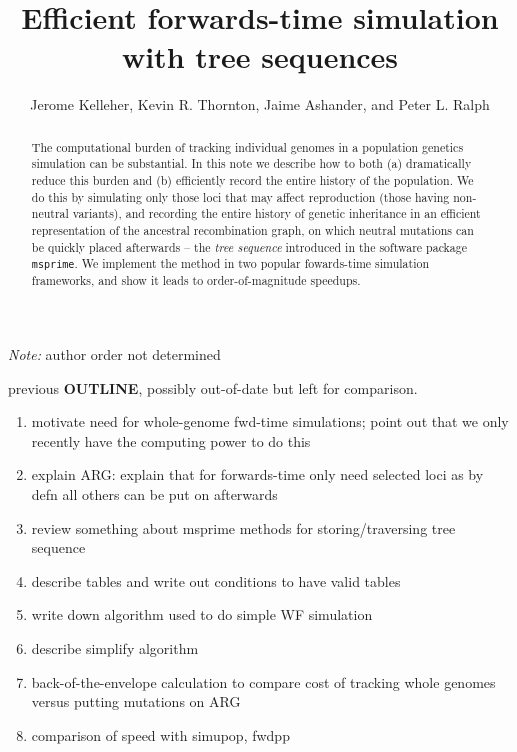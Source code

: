 \documentclass{article}
\newcommand{\msprime}{\texttt{msprime}}
\begin{document}
\title{Efficient forwards-time simulation with tree sequences}
\author{Jerome Kelleher,
        Kevin R. Thornton,
        Jaime Ashander, and
        Peter L. Ralph}
\maketitle

\emph{Note:} author order not determined


\begin{abstract}
    The computational burden of tracking individual genomes 
    in a population genetics simulation can be substantial.
    In this note we describe how to both (a) dramatically reduce this burden and
    (b) efficiently record the entire history of the population.
    We do this by simulating only those loci that may affect reproduction (those having non-neutral variants),
    and recording the entire history of genetic inheritance in an efficient representation of the ancestral recombination graph,
    on which neutral mutations can be quickly placed afterwards --
    the \emph{tree sequence} introduced in the software package \msprime.
    We implement the method in two popular fowards-time simulation frameworks,
    and show it leads to order-of-magnitude speedups.
\end{abstract}


previous \textbf{OUTLINE}, possibly out-of-date but left for comparison.
\begin{enumerate}
    \item motivate need for whole-genome fwd-time simulations; point out that we only recently have the computing power to do this
    \item explain ARG: explain that for forwards-time only need selected loci as by defn all others can be put on afterwards
    \item review something about msprime methods for storing/traversing tree sequence
    \item describe tables and write out conditions to have valid tables
    \item write down algorithm used to do simple WF simulation
    \item describe simplify algorithm
    \item back-of-the-envelope calculation to compare cost of tracking whole genomes versus putting mutations on ARG
    \item comparison of speed with simupop, fwdpp
\end{enumerate}
\end{document}
